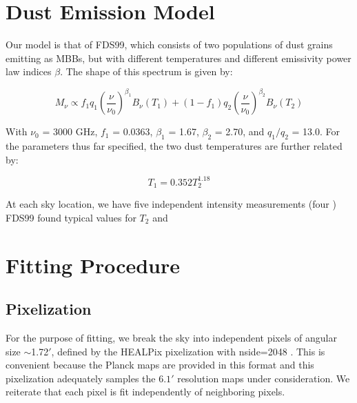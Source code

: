 \documentclass{emulateapj}
\begin{document}
\section{Dust Emission Model}
\label{sec:modeling}

Our model is that of FDS99, which consists of two populations of dust 
grains emitting as MBBs, but with different temperatures and different 
emissivity power law indices $\beta$. The shape of this spectrum is given by:

\begin{equation}
M_{\nu} \propto f_{1}q_{1}(\frac{\nu}{\nu_{0}})^{\beta_1}B_{\nu}(T_1) + (1-f_{1})q_{2}(\frac{\nu}{\nu_0})^{\beta_2}B_{\nu}(T_2)
\end{equation}

With $\nu_0$ = 3000 GHz, $f_{1}$ = 0.0363, $\beta_1$ = 1.67, $\beta_2$ = 2.70, 
and $q_1/q_2$ = 13.0. For the parameters thus far specified, the two dust 
temperatures are further related by:

\begin{equation}
T_1 = 0.352T_2^{1.18}
\end{equation}

At each sky location, we have five independent intensity measurements (four ) 
FDS99 found typical values for $T_2$ and 

\section{Fitting Procedure}
\label{sec:fitting}

\subsection{Pixelization}
\label{sec:pix}
For the purpose of fitting, we break the sky into independent pixels of 
angular size $\sim$1.72$'$, defined by the HEALPix pixelization with nside=2048
\citep{healpix}. This is convenient because the Planck maps are provided in 
this format and this pixelization adequately samples the $6.1'$ resolution maps
under consideration. We reiterate that each pixel is fit independently of 
neighboring pixels.
\end{document}
